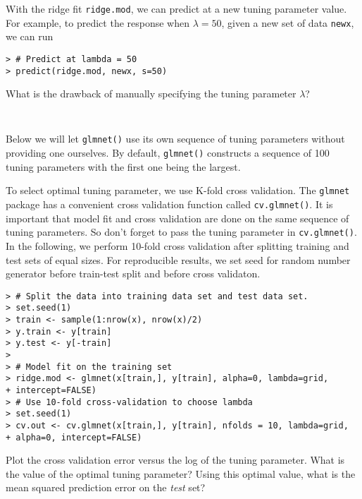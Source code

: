 \documentclass{article}
\begin{document}
\bigskip

With the ridge fit \texttt{ridge.mod}, we can predict at a new tuning parameter value. For example, to predict the response when $\lambda = 50$,
given a new set of data \texttt{newx}, we can run

\begin{Verbatim}[frame=single]
> # Predict at lambda = 50
> predict(ridge.mod, newx, s=50)
\end{Verbatim}
\bigskip

What is the drawback of manually specifying the tuning parameter $\lambda$?

\begin{Verbatim}[frame=single]


\end{Verbatim}
\bigskip

Below we will let \texttt{glmnet()} use its own sequence of tuning parameters without providing one ourselves. By default, \texttt{glmnet()} constructs a sequence of 100 tuning parameters with the first one being the largest.

\bigskip

To select optimal tuning parameter, we use K-fold cross validation. The \texttt{glmnet} package has a convenient cross validation function called \texttt{cv.glmnet()}. It is important that model fit and cross validation are done on the same sequence of tuning parameters. So don't forget to pass the tuning parameter in \texttt{cv.glmnet()}. In the following, we perform 10-fold cross validation after splitting training and test sets of equal sizes. For reproducible results, we set seed for random number generator before train-test split and before cross validaton.

\bigskip

\begin{Verbatim}[frame=single]
> # Split the data into training data set and test data set.
> set.seed(1)
> train <- sample(1:nrow(x), nrow(x)/2)
> y.train <- y[train]
> y.test <- y[-train]
>
> # Model fit on the training set
> ridge.mod <- glmnet(x[train,], y[train], alpha=0, lambda=grid,
+ intercept=FALSE)
> # Use 10-fold cross-validation to choose lambda
> set.seed(1)
> cv.out <- cv.glmnet(x[train,], y[train], nfolds = 10, lambda=grid,
+ alpha=0, intercept=FALSE)
\end{Verbatim}

Plot the cross validation error versus the log of the tuning parameter.
What is the value of the optimal tuning parameter? Using this optimal value,
what is the mean squared prediction error on the \emph{test} set?
\end{document}
